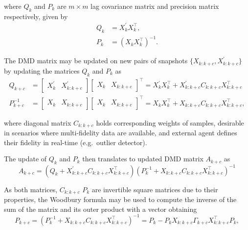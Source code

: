 where \(Q_k\) and \(P_k\) are \(m \times m\) lag covariance matrix and precision matrix respectively, given by
\begin{align}\label{eq:aux-matrices}
	Q_k & = X^\prime_k X_k^\top,   \\
	P_k & = {(X_k X_k^\top)}^{-1}.
\end{align}


The DMD matrix may be updated on new pairs of snapshots \( \{X_{k: k + c}, X^\prime_{k: k + c}\} \) by updating the matrices \(Q_k\) and \(P_k\) as
\begin{align*}
	Q_{k+c}      & = \begin{bmatrix} X^\prime_k  & X^\prime_{k : k + c} \end{bmatrix} \begin{bmatrix} X_{k} & X_{k : k + c} \end{bmatrix}^\top = X^\prime_k X_{k}^\top + X^\prime_{k : k + c} C_{k : k + c} X_{k : k + c}^\top \\
	P^{-1}_{k+c} & = \begin{bmatrix} X_{k} & X_{k : k + c} \end{bmatrix} \begin{bmatrix} X_{k} & X_{k : k + c} \end{bmatrix}^\top = X_{k}X_{k}^\top + X_{k : k + c} C_{k : k + c} X_{k : k + c}^\top,
\end{align*}

where diagonal matrix \(C_{k: k + c}\) holds corresponding weights of samples, desirable in scenarios where multi-fidelity data are available, and external agent defines their fidelity in real-time (e.g.~outlier detector).

The update of \(Q_k\) and \(P_k\) then translates to updated DMD matrix \(A_{k+c}\) as
\begin{equation}
	A_{k+c} = (Q_k + X^\prime_{k : k + c} C_{k : k + c} X_{k : k + c}^\top) {(P_k^{-1} + X_{k : k + c} C_{k : k + c} X_{k : k + c}^\top)}^{-1}
\end{equation}

As both matrices, \(C_{k: k + c}\) \(P_k\) are invertible square matrices due to their properties, the Woodbury formula may be used to compute the inverse of the sum of the matrix and its outer product with a vector obtaining
\begin{equation}\label{eq:precision-matrix-update}
	P_{k+c} = {(P_k^{-1} + X_{k : k + c} C_{k : k + c} X_{k : k + c}^\top)}^{-1} = P_k - P_k X_{k : k + c} \Gamma_{k+c} X_{k : k + c}^\top P_k,
\end{equation}

